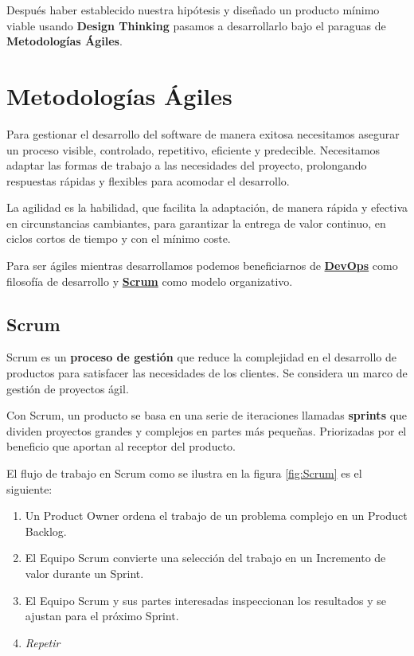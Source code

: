 \documentclass[12pt,twoside,titlepage]{report}
\begin{document}
Después haber establecido nuestra hipótesis y diseñado un producto mínimo viable usando \textbf{Design Thinking} pasamos a desarrollarlo bajo el paraguas de \textbf{Metodologías Ágiles}.

\chapter{Metodologías Ágiles}
\label{sec:agile}
Para gestionar el desarrollo del software de manera exitosa necesitamos asegurar un proceso visible, controlado, repetitivo, eficiente y predecible. Necesitamos adaptar las formas de trabajo a las necesidades del proyecto, prolongando respuestas rápidas y flexibles para acomodar el desarrollo.

La agilidad es la habilidad, que facilita la adaptación, de manera rápida y efectiva en circunstancias cambiantes, para garantizar la entrega de valor continuo, en ciclos cortos de tiempo y con el mínimo coste. \cite{manifiestoAgil} %

Para ser ágiles mientras desarrollamos podemos beneficiarnos de \hyperref[sec:DevOps]{\textbf{DevOps}} como filosofía de desarrollo y \hyperref[sec:Scrum]{\textbf{Scrum}} como modelo organizativo.
\cite{agile}

\section{Scrum}
\label{sec:Scrum}

Scrum es un \textbf{proceso de gestión} que reduce la complejidad en el desarrollo de productos para satisfacer las necesidades de los clientes. Se considera un marco de gestión de proyectos ágil.

Con Scrum, un producto se basa en una serie de iteraciones llamadas \textbf{sprints} que dividen proyectos grandes y complejos en partes más pequeñas. Priorizadas por el beneficio que aportan al receptor del producto.
\cite{scrum1}

El flujo de trabajo en Scrum como se ilustra en la figura \ref{fig:Scrum} es el siguiente:

\begin{enumerate}
    \item Un Product Owner ordena el trabajo de un problema complejo en un Product Backlog.
    \item El Equipo Scrum convierte una selección del trabajo en un Incremento de valor durante un Sprint.
    \item El Equipo Scrum y sus partes interesadas inspeccionan los resultados y se ajustan para el próximo Sprint.
    \item \textit{Repetir}
\end{enumerate}
\end{document}
